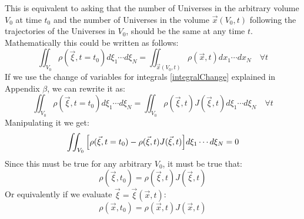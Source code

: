 \documentclass[11pt, a4paper]{article} %
\begin{document}
This is equivalent to asking that the number of Universes in the arbitrary volume $V_0$ at time $t_0$ and the number of Universes in the volume $\vec{x}(V_0,t)$ following the trajectories of the Universes in $V_0$, should be the same at any time $t$. Mathematically this could be written as follows:
\begin{equation}
\iint_{V_0} \rho(\vec{\xi},t=t_0) d\xi_1\cdots d\xi_N=\iint_{\vec{x}(V_0,t)} \rho(\vec{x},t) dx_1\cdots dx_N\quad \forall t
\end{equation}
If we use the change of variables for integrals \eqref{integralChange} explained in Appendix $\beta$, we can rewrite it as:
\begin{equation}
\iint_{V_0} \rho(\vec{\xi},t=t_0) d\xi_1\cdots d\xi_N=\iint_{V_0} \rho(\vec{\xi},t) J(\vec{\xi},t) d\xi_1\cdots d\xi_N \quad \forall t
\end{equation}
Manipulating it we get:
\begin{equation}
\iint_{V_0} \qty[ \rho(\vec{\xi},t=t_0) -\rho(\vec{\xi},t) J(\vec{\xi},t) ]d\xi_1\cdots d\xi_N=0
\end{equation}
Since this must be true for any arbitrary $V_0$, it must be true that:
\begin{equation}
\rho(\vec{\xi},t_0) = \rho(\vec{\xi},t) J(\vec{\xi},t)
\end{equation}
Or equivalently if we evaluate $\vec{\xi}=\vec{\xi}(\vec{x},t)$:
\begin{equation}
\rho(\vec{x},t_0) = \rho(\vec{x},t) J(\vec{x},t)
\end{equation}
\end{document}

